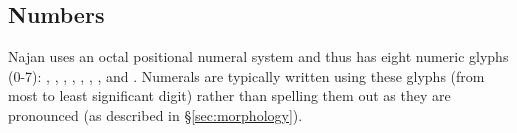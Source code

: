 \subsection{Numbers}


Najan uses an octal positional numeral system and thus has eight numeric glyphs
(0-7): , , , , , , , and
. Numerals are typically written using these glyphs (from most to least
significant digit) rather than spelling them out as they are pronounced (as
described in \S\ref{sec:morphology}).
